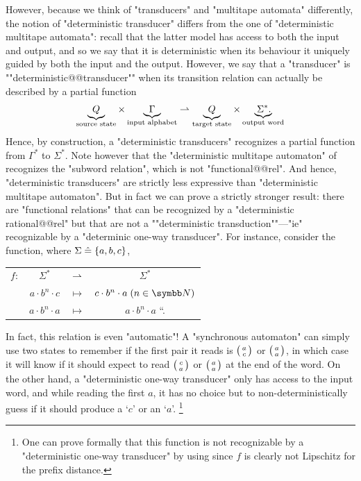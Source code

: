 However, because we think of "transducers" and "multitape automata" differently,
the notion of "deterministic transducer" differs from the one of
"deterministic multitape automata": recall that the latter model has access to both the input
and output, and so we say that it is deterministic when its behaviour it uniquely guided
by both the input and the output. However, we say that a "transducer" is
\AP""deterministic@@transducer"" when its transition relation can actually be described
by a partial function
\[
	\underbrace{Q}_{\text{source state}}
	\times \underbrace{\Gamma}_{\text{input alphabet}}
	\rightharpoonup
	\underbrace{Q}_{\text{target state}}
	\times \underbrace{{\Sigma^*}.\!}_{\text{output word}}
\]
Hence, by construction, a "deterministic transducers" recognizes a partial function
from $\Gamma^*$ to $\Sigma^*$.
Note however that the "deterministic multitape automaton" of 
recognizes the "subword relation", which is not "functional@@rel".
And hence, "deterministic transducers" are strictly less expressive
than "deterministic multitape automaton".
But in fact we can prove a strictly stronger result:
there are "functional relations" that can be recognized by
a "deterministic rational@@rel" but that are not a
\AP""deterministic transduction""---"ie" recognizable by a "determinic one-way transducer".
For instance, consider the function, where $\Sigma \mathrel{\hat{=}} \{a,b,c\}$,
\begin{center}
	\begin{tabular}{rccc}
		$f\colon$ & $\Sigma^*$ & $\rightharpoonup$ & $\Sigma^*$ \\
		& $a\cdot b^n \cdot c$ & $\mapsto$ & $c \cdot b^n \cdot a \;(n\in\N)$ \\
		& $a\cdot b^n \cdot a$ & $\mapsto$ & $a \cdot b^n \cdot a$ \qquad``\quad.
	\end{tabular}
\end{center}
In fact, this relation is even "automatic"! A "synchronous automaton"
can simply use two states to remember if the first pair it reads is
$\pair{a}{c}$ or $\pair{a}{a}$, in which case it will know if it should expect
to read $\pair{c}{a}$ or $\pair{a}{a}$ at the end of the word.
On the other hand, a "deterministic one-way transducer"
only has access to the input word, and while reading the first $a$, it has no choice
but to non-deterministically guess if it should produce a `$c$' or an `$a$'.%
\footnote{One can prove formally that this function is
not recognizable by a "deterministic one-way transducer"
by using \cite[Theorem~V.4.2]{Sakarovitch2009Elements}
since $f$ is clearly not Lipschitz for the prefix distance.}

